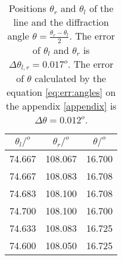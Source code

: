 \begin{table}[H]
	\centering
	\begin{tabular}{ c  c  c }
		\\\hline
		\centering
			$\theta_{l}/^o$ & $\theta_{r}/^o$ & $\theta/^o$ \\\hline
			74.667 & 108.067 & 16.700 \\
			74.667 & 108.083 & 16.708 \\
			74.683 & 108.100 & 16.708 \\
			74.700 & 108.100 & 16.700 \\
			74.633 & 108.083 & 16.725 \\
			74.600 & 108.050 & 16.725 \\\hline
	\end{tabular}
	\caption{\label{Tab:unKnownWL}Positions $\theta_r$ and $\theta_l$ of the \cl line and the diffraction angle $\theta = \frac{\theta_r-\theta_l}{2}$. The error of $\theta_l$ and $\theta_r$ is $\Delta \theta_{l,r} = 0.017^o$. The error of $\theta$ calculated by the equation \ref{eq:err:angles} on the appendix \ref{appendix} is $\Delta \theta = 0.012^o$.}
\end{table}
